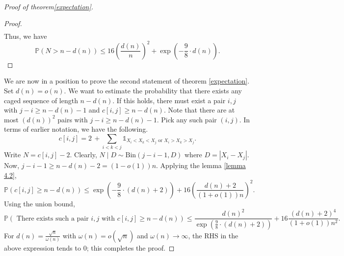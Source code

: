\documentclass[11pt, a4paper]{article}
\theoremstyle{compact}
\begin{document}
\begin{proof}[Proof of theorem\ref{expectation}]
\begin{proof}
\begin{align}
    \end{align}
Thus, we have 
$$
\mathbb{P}(N>n-d(n)) \leq 16\left(\frac{d(n)}{n}\right)^2 + \exp\left(-\frac{9}{8}\cdot d(n)\right).
$$
\end{proof}
We are now in a position to prove the second statement of theorem \ref{expectation}. \\
Set $d(n)=o(n)$. We want to estimate the probability that there exists any caged sequence of length $n - d(n)$. If this holds, there must exist a pair $i, j $ with $j - i  \geq n - d(n) - 1$ and $c[i, j] \geq n - d(n)$. Note that there are at most $(d(n))^2$ pairs with $j - i \geq n - d(n) - 1$. Pick any such pair $(i, j)$. In terms of earlier notation, we have the following.
\[
   c[i, j] = 2 \, +  \displaystyle \sum_{i < k < j} \displaystyle  \mathbb{1}_{X_i < X_k <X_j \text{ or } X_i > X_k > X_j}. 
\]
Write $N = c[i, j] - 2$. Clearly, $N \mid D \sim \text{Bin}(j - i - 1, D)$ where $D = |X_i - X_j|$. Now, $j - i - 1 \geq n - d(n) - 2 = (1-o(1))n$. Applying the lemma \ref{lemma 4.2}, 
\[
  \mathbb{P}\left( c[i, j] \geq n - d(n) \right) \leq  \exp{\left(-\frac{9}{8}\cdot (d(n) + 2) \right)} + 16\left(\frac{d(n) + 2}{(1+o(1))n}\right)^2.
\]
Using the union bound, 
\[
\mathbb{P}\left( \text{ There exists such a pair $i, j$ with } c[i, j] \geq n - d(n) \right) \leq \frac{d(n)^2}{\exp{\left(\frac{9}{8}\cdot (d(n) + 2) \right)}} + 16\frac{(d(n) + 2)^4}{(1+o(1))n^2}.
\]
For $d(n) = \frac{\sqrt{n}}{\omega(n)}$ with $\omega(n) = o(\sqrt{n})$ and $\omega(n) \rightarrow \infty $, the RHS in the above expression tends to $0$; this completes the proof.
\end{proof}
\end{document}

